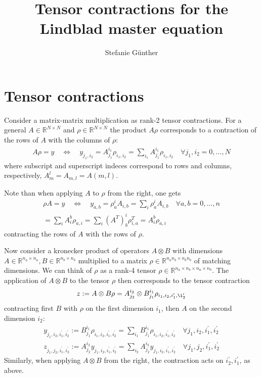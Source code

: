 \documentclass[letterpaper]{article}
\title{Tensor contractions for the Lindblad master equation}
\author{Stefanie G{\"u}nther}
\newcommand{\R}{\mathds{R}}
\begin{document}
\maketitle

\section{Tensor contractions}
Consider a matrix-matrix multiplication as rank-2 tensor contractions. For a general $A\in \R^{N\times N}$ and $\rho\in \R^{N\times N}$ the product $A\rho$ corresponds to a contraction of the rows of $A$ with the columns of $\rho$:
\begin{align}
    A \rho = y \quad \Leftrightarrow \quad y_{j_1,i_2} = A_{j_1}^{i_1} \rho_{i_1,i_2} = \sum_{i_1} A_{j_1}^{i_1} \rho_{i_1,i_2} \quad \forall j_1,i_2 = 0,\dots, N
\end{align}
where subscript and superscript indeces correspond to rows and columns, respectively, $A_m^l = A_{m,l} = A(m,l)$. 

Note than when applying $A$ to $\rho$ from the right, one gets 
\begin{align}
    \rho A = y \quad \Leftrightarrow \quad y_{a,b} = \rho_a^{i} A_{i,b} = \sum_i \rho_a^i A_{i,b} \quad \forall a,b = 0,\dots, n \\
   = \sum_i A_i^b \rho_{a,i} = \sum_i (A^T)_b^i \rho^T_{i,a} = A_i^b \rho_{a,i}
\end{align}
contracting the rows of $A$ with the rows of $\rho$. 

Now consider a kronecker product of operators $A\otimes B$ with dimensions $A\in\R^{n_a\times n_a}, B\in\R^{n_b\times n_b}$ multiplied to a matrix $\rho \in \R^{n_an_b\times n_bn_b}$ of matching dimensions. We can think of $\rho$ as a rank-4 tensor $\rho\in\R^{n_a\times n_b \times n_a \times n_b}$. The application of $A\otimes B$ to the tensor $\rho$ then corresponds to the tensor contraction 
\begin{align}
    z := A\otimes B \rho = A_{j_2}^{i_2}\otimes B_{j_1}^{i_1} \rho_{i_1, i_2, i_1^{\prime}, \i_2^{\prime}}
\end{align}
contracting first $B$ with $\rho$ on the first dimension $i_1$, then $A$ on the second dimension $i_2$:
\begin{align}
    y_{j_1, i_2, i_1^{\prime}, i_2^{\prime}} := B_{j_1}^{i_1} \rho_{i_1, i_2, i_1^{\prime}, i_2^{\prime}} = \sum_{i_1} B_{j_1}^{i_1} \rho_{i_1, i_2, i_1^{\prime}, i_2^{\prime}} \quad \forall j_1,i_2,i_1^\prime, i_2^\prime\\
    z_{j_1, j_2, i_1^{\prime}, i_2^{\prime}} := A_{j_2}^{i_2} y_{j_1, i_2, i_1^{\prime}, i_2^{\prime}} = \sum_{i_2} A_{j_2}^{i_2} y_{j_1, i_2, i_1^{\prime}, i_2^{\prime}} \quad \forall j_1,j_2,i_1^\prime, i_2^\prime
\end{align}
Similarly, when applying $A\otimes B$ from the right, the contraction acts on $i_2^\prime, i_1^\prime$, as above. 
\end{document}
